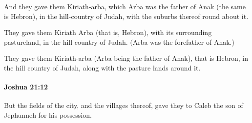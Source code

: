 			\begin{versebox}
					\item[BHS] 
					\item[ASV] And they gave them Kiriath-arba, which Arba was the father of Anak (the same is Hebron), in the hill-country of Judah, with the suburbs thereof round about it.
					\item[NIV] They gave them Kiriath Arba (that is, Hebron), with its surrounding pastureland, in the hill country of Judah. (Arba was the forefather of Anak.)
					\item[NRSV] They gave them Kiriath-arba (Arba being the father of Anak), that is Hebron, in the hill country of Judah, along with the pasture lands around it.
			\end{versebox}

		\paragraph{Joshua 21:12} %
			\label{JOSHUA-21-12}

			But the fields of the city, and the villages thereof, gave they to Caleb the son of Jephunneh for his possession.

